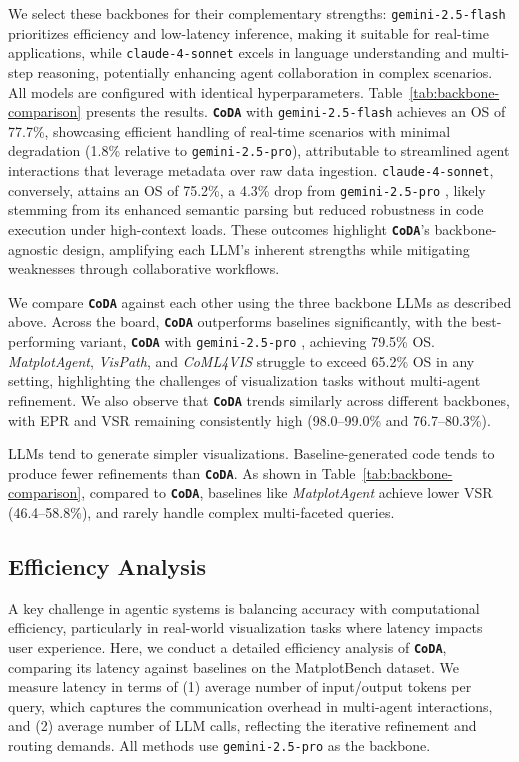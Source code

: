 \documentclass[11pt, a4paper, logo, copyright]{googlecloud}
\newcommand{\methodname}{\textbf{\texttt{\textcolor{StarIndigo}{C}\textcolor{StarIndigo}{o}\textcolor{StarCoral}{D}\textcolor{StarTeal}{A}}}}
\newcommand{\io}[1]{\setlength{\fboxsep}{1pt}\colorbox{gray!10}{\texttt{#1}}}
\begin{document}
We select these backbones for their complementary strengths: \io{gemini-2.5-flash} prioritizes efficiency and low-latency inference, making it suitable for real-time applications, while \io{claude-4-sonnet} excels in language understanding and multi-step reasoning, potentially enhancing agent collaboration in complex scenarios. All models are configured with identical hyperparameters. Table~\ref{tab:backbone-comparison} presents the results. \methodname{} with \io{gemini-2.5-flash} achieves an OS of 77.7\%, showcasing efficient handling of real-time scenarios with minimal degradation (1.8\% relative to \io{gemini-2.5-pro}), attributable to streamlined agent interactions that leverage metadata over raw data ingestion. \io{claude-4-sonnet}, conversely, attains an OS of 75.2\%, a 4.3\% drop from \io{gemini-2.5-pro} , likely stemming from its enhanced semantic parsing but reduced robustness in code execution under high-context loads. These outcomes highlight \methodname{}'s backbone-agnostic design, amplifying each LLM's inherent strengths while mitigating weaknesses through collaborative workflows. 

We compare \methodname{} against each other using the three backbone LLMs as described above. Across the board, \methodname{} outperforms baselines significantly, with the best-performing variant, \methodname{} with \io{gemini-2.5-pro} , achieving 79.5\% OS. \textit{MatplotAgent}, \textit{VisPath}, and \textit{CoML4VIS} struggle to exceed 65.2\% OS in any setting, highlighting the challenges of visualization tasks without multi-agent refinement. We also observe that \methodname{} trends similarly across different backbones, with EPR and VSR remaining consistently high (98.0--99.0\% and 76.7--80.3\%). 


LLMs tend to generate simpler visualizations. Baseline-generated code tends to produce fewer refinements than \methodname{}. As shown in Table~\ref{tab:backbone-comparison}, compared to \methodname{}, baselines like \textit{MatplotAgent} achieve lower VSR (46.4--58.8\%), and rarely handle complex multi-faceted queries.



\subsection{Efficiency Analysis}

A key challenge in agentic systems is balancing accuracy with computational efficiency, particularly in real-world visualization tasks where latency impacts user experience. 
Here, we conduct a detailed efficiency analysis of \methodname{}, comparing its latency against baselines on the MatplotBench dataset. 
We measure latency in terms of (1) average number of input/output tokens per query, which captures the communication overhead in multi-agent interactions, and (2) average number of LLM calls, reflecting the iterative refinement and routing demands. 
All methods use \io{gemini-2.5-pro} as the backbone. 
\end{document}
